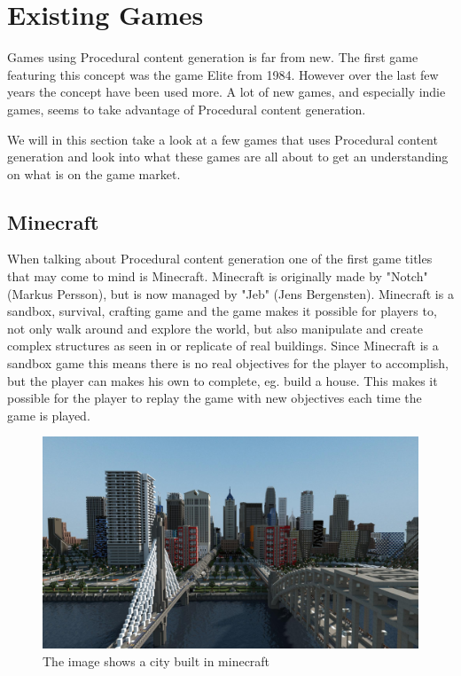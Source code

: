 \section{Existing Games}

Games using Procedural content generation is far from new. The first game featuring this concept was the game Elite from 1984\cite{firstpcg}. However over the last few years the concept have been used more. A lot of new games, and especially indie games, seems to take advantage of Procedural content generation.

We will in this section take a look at a few games that uses Procedural content generation and look into what these games are all about to get an understanding on what is on the game market.

\subsection{Minecraft}

When talking about Procedural content generation one of the first game titles that may come to mind is Minecraft. Minecraft is originally made by "Notch" (Markus Persson), but is now managed by "Jeb" (Jens Bergensten)\cite{Minecraft}. Minecraft is a sandbox, survival, crafting game and the game makes it possible for players to, not only walk around and explore the world, but also manipulate and create complex structures as seen in  or replicate of real buildings. Since Minecraft is a sandbox game this means there is no real objectives for the player to accomplish, but the player can makes his own to complete, eg. build a house. This makes it possible for the player to replay the game with new objectives each time the game is played.

\begin{figure}[H]
	\includegraphics[width=0.7\linewidth]{img/MinecraftCity}
	\centering
	\caption{The image shows a city built in minecraft}
	\label{fig:MinecraftCity}
\end{figure}


